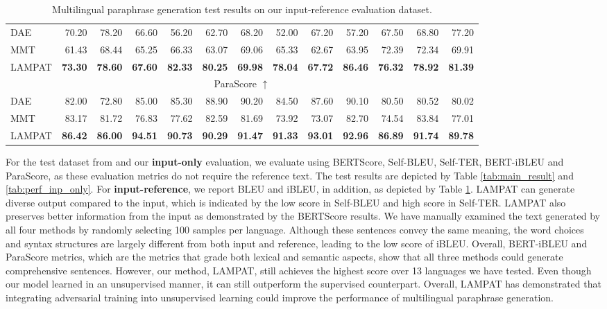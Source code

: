 \documentclass[letterpaper]{article} %
\begin{document}
\begin{table}[h!]
{\begin{tabular}{|lrrrrrrrrrrrr|}
\multicolumn{1}{|l|}{DAE} &
  70.20 &
  78.20 &
  66.60 &
  56.20 &
  62.70 &
  68.20 &
  52.00 &
  67.20 &
  57.20 &
  67.50 &
  68.80 &
  77.20 \\
\multicolumn{1}{|l|}{MMT} &
  61.43 &
  68.44 &
  65.25 &
  66.33 &
  63.07 &
  69.06 &
  65.33 &
  62.67 &
  63.95 &
  72.39 &
  72.34 &
  69.91 \\
\multicolumn{1}{|l|}{LAMPAT} &
  \textbf{73.30} &
  \textbf{78.60} &
  \textbf{67.60} &
  \textbf{82.33} &
  \textbf{80.25} &
  \textbf{69.98} &
  \textbf{78.04} &
  \textbf{67.72} &
  \textbf{86.46} &
  \textbf{76.32} &
  \textbf{78.92} &
  \textbf{81.39} \\ \hline
\multicolumn{13}{|c|}{ParaScore $\uparrow$} \\ \hline
\multicolumn{1}{|l|}{DAE} &
  82.00 &
  72.80 &
  85.00 &
  85.30 &
  88.90 &
  90.20 &
  84.50 &
  87.60 &
  90.10 &
  80.50 &
  80.52 &
  80.02 \\
\multicolumn{1}{|l|}{MMT} &
  83.17 &
  81.72 &
  76.83 &
  77.62 &
  82.59 &
  81.69 &
  73.92 &
  73.07 &
  82.70 &
  74.54 &
  83.84 &
  77.01 \\
\multicolumn{1}{|l|}{LAMPAT} &
  \textbf{86.42} &
  \textbf{86.00} &
  \textbf{94.51}&
  \textbf{90.73} &
  \textbf{90.29} &
  \textbf{91.47} &
  \textbf{91.33} &
  \textbf{93.01} &
  \textbf{92.96} &
  \textbf{86.89} &
  \textbf{91.74} &
  \textbf{89.78} \\ \hline
\end{tabular}}
\caption{Multilingual paraphrase generation test results on our input-reference evaluation dataset.}
\label{tab:perf_inp_ref}
\end{table}

For the test dataset from \citet{guo2019zeroshot} and our \textbf{input-only} evaluation, we evaluate using BERTScore, Self-BLEU, Self-TER, BERT-iBLEU and ParaScore, as these evaluation metrics do not require the reference text. The test results are depicted by Table \ref{tab:main_result} and \ref{tab:perf_inp_only}. For \textbf{input-reference}, we report BLEU and iBLEU, in addition, as depicted by Table \ref{tab:perf_inp_ref}. LAMPAT can generate diverse output compared to the input, which is indicated by the low score in Self-BLEU and high score in Self-TER. LAMPAT also preserves better information from the input as demonstrated by the BERTScore results. We have manually examined the text generated by all four methods by randomly selecting 100 samples per language. Although these sentences convey the same meaning, the word choices and syntax structures are largely different from both input and reference, leading to the low score of iBLEU. Overall, BERT-iBLEU and ParaScore metrics, which are the metrics that grade both lexical and semantic aspects, show that all three methods could generate comprehensive sentences. However, our method, LAMPAT, still achieves the highest score over 13 languages we have tested. Even though our model learned in an unsupervised manner, it can still outperform the supervised counterpart. Overall, LAMPAT has demonstrated that integrating adversarial training into unsupervised learning could improve the performance of multilingual paraphrase generation.
\end{document}
